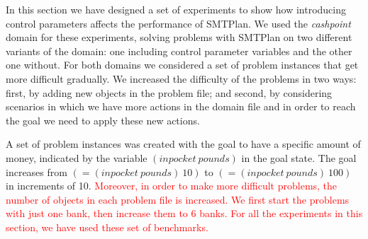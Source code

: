 In this section we have designed a set of experiments to show how introducing control parameters affects the performance of SMTPlan. We used the \textit{cashpoint} domain for these experiments, solving problems with SMTPlan on two different variants of the domain: one including control parameter variables and the other one without. For both domains we considered a set of problem instances that get more difficult gradually. We increased the difficulty of the problems in two ways: first, by adding new objects in the problem file; and second, by considering scenarios in which we have more actions in the domain file and in order to reach the goal we need to apply these new actions. 

A set of problem instances was created with the goal to have a specific amount of money, indicated by the variable  $(inpocket \ pounds)$ in the goal state. The goal increases from $( = (inpocket \ pounds)\  10) $  to  $( = (inpocket \ pounds)\ 100)$ in increments of 10.
\textcolor{red}{Moreover, in order to make more difficult problems, the number of objects in each problem file is increased. We first start the problems with just one bank, then increase them to 6 banks. For all the experiments in this section, we have used these set of benchmarks.}

